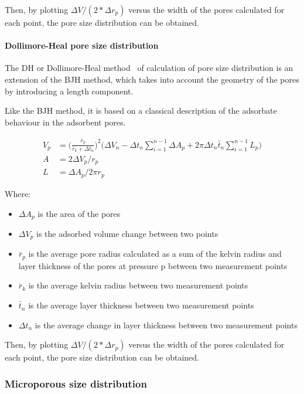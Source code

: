Then, by plotting \(\Delta V / (2*\Delta r_p)\) versus the width of the pores calculated
for each point, the pore size distribution can be obtained.

\paragraph{Dollimore-Heal pore size distribution}

The DH or Dollimore-Heal method~\cite{dollimorePoresizeDistributionTypical1970}
of calculation of pore size distribution is an
extension of the BJH method, which takes into account the geometry of the pores
by introducing a length component.

Like the BJH method, it is based on a classical description of the adsorbate behaviour
in the adsorbent pores.

\begin{align}
	V_p & = \Big(\frac{\bar{r}_p}{\bar{r}_k + \Delta t_n}\Big)^2
	\Big(\Delta V_n - \Delta t_n \sum_{i=1}^{n-1} \Delta A_p
	+ 2 \pi \Delta t_n \bar{t}_n \sum_{i=1}^{n-1} L_p\Big)       \\
	A   & = 2 \Delta V_p / r_p                                   \\
	L   & = \Delta A_p / 2 \pi r_p
\end{align}

Where:
\begin{itemize}

	\item \(\Delta A_p\) is the area of the pores
	\item \(\Delta V_p\) is the adsorbed volume change between two points
	\item \(\bar{r}_p\) is the average pore radius calculated as a sum of the
	      kelvin radius and layer thickness of the pores at pressure p between two
	      measurement points
	\item \(\bar{r}_k\) is the average kelvin radius between two measurement points
	\item \(\bar{t}_n\) is the average layer thickness between two measurement points
	\item \(\Delta t_n\) is the average change in layer thickness between two measurement points
\end{itemize}

Then, by plotting \(\Delta V/(2*\Delta r_p)\) versus the width of the pores calculated
for each point, the pore size distribution can be obtained.

\subsubsection{Microporous size distribution}

